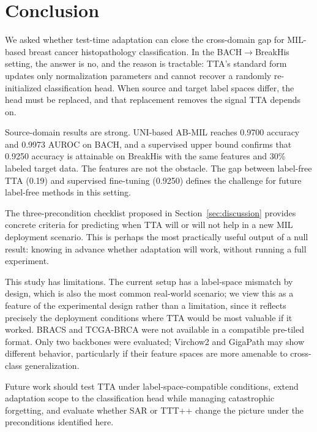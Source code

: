 \documentclass[conference]{IEEEtran}
\begin{document}
\section{Conclusion}
\label{sec:conclusion}

We asked whether test-time adaptation can close the cross-domain gap for MIL-based breast cancer histopathology classification. In the BACH$\rightarrow$BreakHis setting, the answer is no, and the reason is tractable: TTA's standard form updates only normalization parameters and cannot recover a randomly re-initialized classification head. When source and target label spaces differ, the head must be replaced, and that replacement removes the signal TTA depends on.

Source-domain results are strong. UNI-based AB-MIL reaches 0.9700 accuracy and 0.9973 AUROC on BACH, and a supervised upper bound confirms that 0.9250 accuracy is attainable on BreakHis with the same features and 30\% labeled target data. The features are not the obstacle. The gap between label-free TTA (0.19) and supervised fine-tuning (0.9250) defines the challenge for future label-free methods in this setting.

The three-precondition checklist proposed in Section~\ref{sec:discussion} provides concrete criteria for predicting when TTA will or will not help in a new MIL deployment scenario. This is perhaps the most practically useful output of a null result: knowing in advance whether adaptation will work, without running a full experiment.

This study has limitations. The current setup has a label-space mismatch by design, which is also the most common real-world scenario; we view this as a feature of the experimental design rather than a limitation, since it reflects precisely the deployment conditions where TTA would be most valuable if it worked. BRACS and TCGA-BRCA were not available in a compatible pre-tiled format. Only two backbones were evaluated; Virchow2 and GigaPath may show different behavior, particularly if their feature spaces are more amenable to cross-class generalization.

Future work should test TTA under label-space-compatible conditions, extend adaptation scope to the classification head while managing catastrophic forgetting, and evaluate whether SAR \cite{niu2023towards} or TTT++ \cite{liu2021ttt} change the picture under the preconditions identified here.



\end{document}
